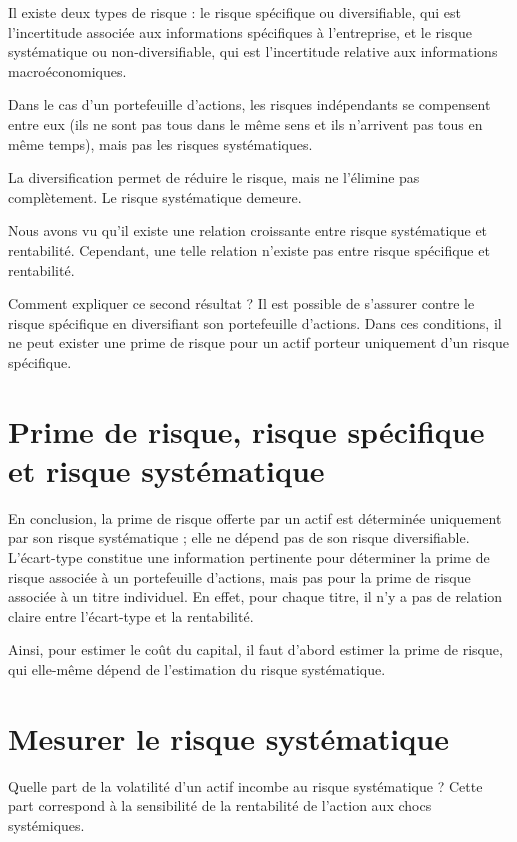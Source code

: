 \documentclass[a4paper, 12pt]{report}
\begin{document}
Il existe deux types de risque : le risque spécifique ou diversifiable, qui est l'incertitude associée aux informations spécifiques à l'entreprise, et le risque systématique ou non-diversifiable, qui est l'incertitude relative aux informations macroéconomiques.

Dans le cas d'un portefeuille d'actions, les risques indépendants se compensent entre eux (ils ne sont pas tous dans le même sens et ils n'arrivent pas tous en même temps), mais pas les risques systématiques.

La diversification permet de réduire le risque, mais ne l'élimine pas complètement. Le risque systématique demeure.

Nous avons vu qu'il existe une relation croissante entre risque systématique et rentabilité. Cependant, une telle relation n'existe pas entre risque spécifique et rentabilité. 

Comment expliquer ce second résultat ? Il est possible de s'assurer contre le risque spécifique en diversifiant son portefeuille d'actions. Dans ces conditions, il ne peut exister une prime de risque pour un actif porteur uniquement d'un risque spécifique.

\section{Prime de risque, risque spécifique et risque systématique}

En conclusion, la prime de risque offerte par un actif est déterminée uniquement par son risque systématique ; elle ne dépend pas de son risque diversifiable. L'écart-type constitue une information pertinente pour déterminer la prime de risque associée à un portefeuille d'actions, mais pas pour la prime de risque associée à un titre individuel. En effet, pour chaque titre, il n'y a pas de relation claire entre l'écart-type et la rentabilité.

Ainsi, pour estimer le coût du capital, il faut d'abord estimer la prime de risque, qui elle-même dépend de l'estimation du risque systématique.

\section{Mesurer le risque systématique}


Quelle part de la volatilité d'un actif incombe au risque systématique ? Cette part correspond à la sensibilité de la rentabilité de l'action aux chocs systémiques. 
\end{document}
